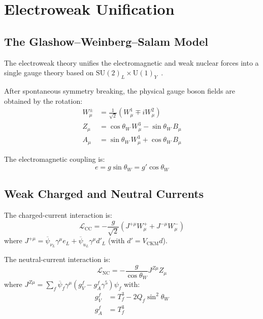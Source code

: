 \documentclass[12pt]{article}
\theoremstyle{definition}
\theoremstyle{remark}
\newcommand{\Lagr}{\mathcal{L}}
\newcommand{\psibar}{\overline{\psi}}
\begin{document}
\section{Electroweak Unification}
\label{sec:electroweak}

\subsection{The Glashow--Weinberg--Salam Model}

The electroweak theory unifies the electromagnetic and weak nuclear forces into a single gauge theory based on $\mathrm{SU}(2)_L \times \mathrm{U}(1)_Y$~\cite{Glashow1961,Weinberg1967,Salam1968}.

After spontaneous symmetry breaking, the physical gauge boson fields are obtained by the rotation:
\begin{align}
W^\pm_\mu &= \frac{1}{\sqrt{2}}(W^1_\mu \mp i W^2_\mu) \\
Z_\mu &= \cos\theta_W \, W^3_\mu - \sin\theta_W \, B_\mu \\
A_\mu &= \sin\theta_W \, W^3_\mu + \cos\theta_W \, B_\mu
\end{align}

The electromagnetic coupling is:
\begin{equation}
e = g \sin\theta_W = g' \cos\theta_W
\end{equation}

\subsection{Weak Charged and Neutral Currents}

The charged-current interaction is:
\begin{equation}
\Lagr_{\mathrm{CC}} = -\frac{g}{\sqrt{2}}\left( J^{+\mu} W^+_\mu + J^{-\mu} W^-_\mu \right)
\end{equation}
where $J^{+\mu} = \psibar_{\nu_L} \gamma^\mu e_L + \psibar_{u_L} \gamma^\mu d'_L$ (with $d' = V_{\mathrm{CKM}} d$).

The neutral-current interaction is:
\begin{equation}
\Lagr_{\mathrm{NC}} = -\frac{g}{\cos\theta_W} J^{Z\mu} Z_\mu
\end{equation}
where $J^{Z\mu} = \sum_f \psibar_f \gamma^\mu (g_V^f - g_A^f \gamma^5) \psi_f$ with:
\begin{align}
g_V^f &= T^3_f - 2Q_f \sin^2\theta_W \\
g_A^f &= T^3_f
\end{align}
\end{document}
